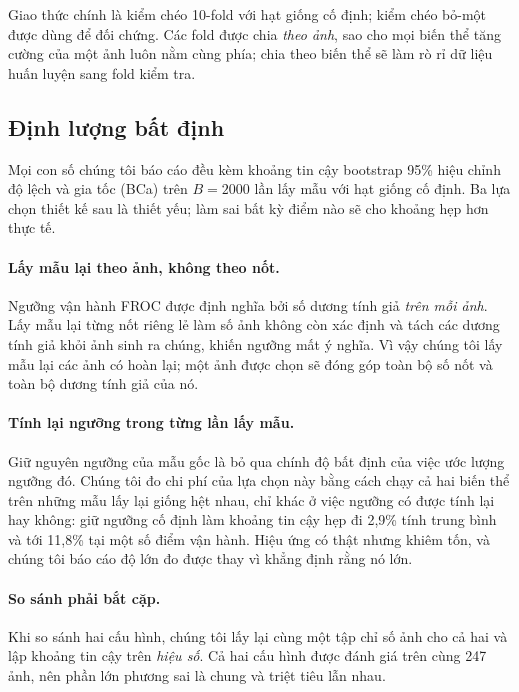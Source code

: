 \documentclass[12pt,a4paper]{article}
\begin{document}
Giao thức chính là kiểm chéo 10-fold với hạt giống cố định; kiểm chéo bỏ-một được
dùng để đối chứng. Các fold được chia \emph{theo ảnh}, sao cho mọi biến thể tăng
cường của một ảnh luôn nằm cùng phía; chia theo biến thể sẽ làm rò rỉ dữ liệu
huấn luyện sang fold kiểm tra.

\subsection{Định lượng bất định}
\label{sec:bootstrap-vi}

Mọi con số chúng tôi báo cáo đều kèm khoảng tin cậy bootstrap 95\% hiệu chỉnh độ
lệch và gia tốc (BCa) trên $B = 2000$ lần lấy mẫu với hạt giống cố định. Ba lựa
chọn thiết kế sau là thiết yếu; làm sai bất kỳ điểm nào sẽ cho khoảng hẹp hơn
thực tế.

\paragraph{Lấy mẫu lại theo ảnh, không theo nốt.}
Ngưỡng vận hành FROC được định nghĩa bởi số dương tính giả \emph{trên mỗi ảnh}.
Lấy mẫu lại từng nốt riêng lẻ làm số ảnh không còn xác định và tách các dương tính
giả khỏi ảnh sinh ra chúng, khiến ngưỡng mất ý nghĩa. Vì vậy chúng tôi lấy mẫu
lại các ảnh có hoàn lại; một ảnh được chọn sẽ đóng góp toàn bộ số nốt và toàn bộ
dương tính giả của nó.

\paragraph{Tính lại ngưỡng trong từng lần lấy mẫu.}
Giữ nguyên ngưỡng của mẫu gốc là bỏ qua chính độ bất định của việc ước lượng
ngưỡng đó. Chúng tôi đo chi phí của lựa chọn này bằng cách chạy cả hai biến thể
trên những mẫu lấy lại giống hệt nhau, chỉ khác ở việc ngưỡng có được tính lại
hay không: giữ ngưỡng cố định làm khoảng tin cậy hẹp đi 2,9\% tính trung bình và
tới 11,8\% tại một số điểm vận hành. Hiệu ứng có thật nhưng khiêm tốn, và chúng
tôi báo cáo độ lớn đo được thay vì khẳng định rằng nó lớn.

\paragraph{So sánh phải bắt cặp.}
Khi so sánh hai cấu hình, chúng tôi lấy lại cùng một tập chỉ số ảnh cho cả hai và
lập khoảng tin cậy trên \emph{hiệu số}. Cả hai cấu hình được đánh giá trên cùng
247 ảnh, nên phần lớn phương sai là chung và triệt tiêu lẫn nhau.
\end{document}
